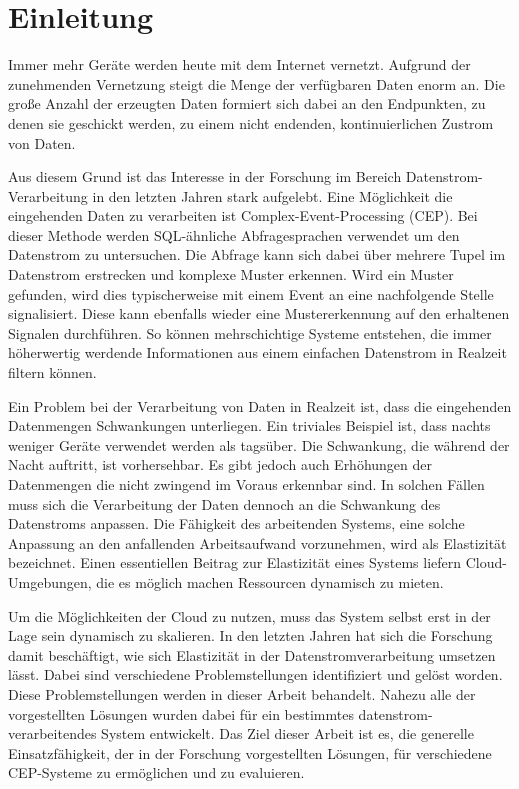 
\chapter{Einleitung}

Immer mehr Geräte werden heute mit dem Internet vernetzt.
Aufgrund der zunehmenden Vernetzung steigt die Menge der verfügbaren Daten enorm an.
Die große Anzahl der erzeugten Daten formiert sich dabei an den Endpunkten, zu denen sie geschickt werden, zu einem nicht endenden, kontinuierlichen Zustrom von Daten.

Aus diesem Grund ist das Interesse in der Forschung im Bereich Datenstrom-Verarbeitung in den letzten Jahren stark aufgelebt.
Eine Möglichkeit die eingehenden Daten zu verarbeiten ist Complex-Event-Processing (CEP).
Bei dieser Methode werden SQL-ähnliche Abfragesprachen verwendet um den Datenstrom zu untersuchen.
Die Abfrage kann sich dabei über mehrere Tupel im Datenstrom erstrecken und komplexe Muster erkennen.
Wird ein Muster gefunden, wird dies typischerweise mit einem Event an eine nachfolgende Stelle signalisiert.
Diese kann ebenfalls wieder eine Mustererkennung auf den erhaltenen Signalen durchführen.
So können mehrschichtige Systeme entstehen, die immer höherwertig werdende Informationen aus einem einfachen Datenstrom in Realzeit filtern können.

Ein Problem bei der Verarbeitung von Daten in Realzeit ist, dass die eingehenden Datenmengen Schwankungen unterliegen.
Ein triviales Beispiel ist, dass nachts weniger Geräte verwendet werden als tagsüber.
Die Schwankung, die während der Nacht auftritt, ist vorhersehbar.
Es gibt jedoch auch Erhöhungen der Datenmengen die nicht zwingend im Voraus erkennbar sind.
In solchen Fällen muss sich die Verarbeitung der Daten dennoch an die Schwankung des Datenstroms anpassen.
Die Fähigkeit des arbeitenden Systems, eine solche Anpassung an den anfallenden Arbeitsaufwand vorzunehmen, wird als Elastizität bezeichnet.
Einen essentiellen Beitrag zur Elastizität eines Systems liefern Cloud-Umgebungen, die es möglich machen Ressourcen dynamisch zu mieten.

Um die Möglichkeiten der Cloud zu nutzen, muss das System selbst erst in der Lage sein dynamisch zu skalieren.
In den letzten Jahren hat sich die Forschung damit beschäftigt, wie sich Elastizität in der Datenstromverarbeitung umsetzen lässt.
Dabei sind verschiedene Problemstellungen identifiziert und gelöst worden.
Diese Problemstellungen werden in dieser Arbeit behandelt.
Nahezu alle der vorgestellten Lösungen wurden dabei für ein bestimmtes datenstrom-verarbeitendes System entwickelt.
Das Ziel dieser Arbeit ist es, die generelle Einsatzfähigkeit, der in der Forschung vorgestellten Lösungen, für verschiedene CEP-Systeme zu ermöglichen und zu evaluieren.

